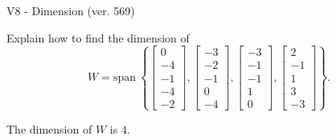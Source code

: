 \begin{exercise}
  \begin{exerciseTitle}V8 - Dimension (ver. 569)\end{exerciseTitle}
  \begin{exerciseStatement}
    Explain how to find the dimension of 
\[W=\mathrm{span}\ \left\{\left[\begin{array}{r}
0 \\
-4 \\
-1 \\
-4 \\
-2
\end{array}\right] , \left[\begin{array}{r}
-3 \\
-2 \\
-1 \\
0 \\
-4
\end{array}\right] , \left[\begin{array}{r}
-3 \\
-1 \\
-1 \\
1 \\
0
\end{array}\right] , \left[\begin{array}{r}
2 \\
-1 \\
1 \\
3 \\
-3
\end{array}\right]\right\}.\]



  \end{exerciseStatement}
  \begin{exerciseAnswer}
   The dimension of \(W\) is  \(4\).
  


  \end{exerciseAnswer}
\end{exercise}